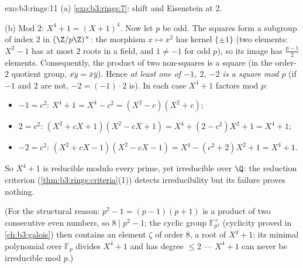 \begin{solution}{exo:b3:rings:11}
(a) \cref{exo:b3:rings:7}: shift and Eisenstein at $2$.

(b) Mod $2$: $X^4 + 1 = (X + 1)^4$. Now let $p$ be odd. The
squares form a subgroup of index $2$ in $(\Z/p\Z)^\times$: the
morphism $x \mapsto x^2$ has kernel $\{\pm 1\}$ (two elements: $X^2
- 1$ has at most $2$ roots in a field, and $1 \neq -1$ for odd
$p$), so its image has $\frac{p-1}2$ elements. Consequently, the
product of two non-squares is a square (in the order-$2$ quotient
group, $\overline{xy} = \bar x\bar y$). Hence \emph{at least one
of $-1$, $2$, $-2$ is a square mod $p$} (if $-1$ and $2$ are not,
$-2 = (-1)\cdot 2$ is). In each case $X^4 + 1$ factors mod $p$:
\begin{itemize}
  \item $-1 = c^2$: \quad $X^4 + 1 = X^4 - c^2 = (X^2 - c)(X^2 +
        c)$;
  \item $2 = c^2$: \quad $(X^2 + cX + 1)(X^2 - cX + 1) = X^4 + (2
        - c^2)X^2 + 1 = X^4 + 1$;
  \item $-2 = c^2$: \quad $(X^2 + cX - 1)(X^2 - cX - 1) = X^4 -
        (c^2 + 2)X^2 + 1 = X^4 + 1$.
\end{itemize}
So $X^4+1$ is reducible modulo every prime, yet irreducible over
$\Q$: the reduction criterion (\cref{thm:b3:rings:criteria}(1))
detects irreducibility but its failure proves nothing.

(For the structural reason: $p^2 - 1 = (p-1)(p+1)$ is a product of
two consecutive even numbers, so $8 \mid p^2 - 1$; the cyclic
group $\mathbb F_{p^2}^\times$ (cyclicity proved in
\cref{ch:b3:galois}) then contains an element $\zeta$ of order
$8$, a root of $X^4 + 1$; its minimal polynomial over $\mathbb
F_p$ divides $X^4+1$ and has degree $\leq 2$ --- $X^4+1$ can never
be irreducible mod $p$.)
\end{solution}

